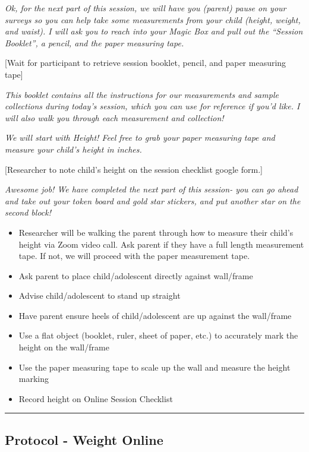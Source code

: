 \documentclass[]{book}
\providecommand{\tightlist}{%
  \setlength{\itemsep}{0pt}\setlength{\parskip}{0pt}}
\begin{document}
\emph{Ok, for the next part of this session, we will have you (parent) pause on your surveys so you can help take some measurements from your child (height, weight, and waist). I will ask you to reach into your Magic Box and pull out the ``Session Booklet'', a pencil, and the paper measuring tape.}

{[}Wait for participant to retrieve session booklet, pencil, and paper measuring tape{]}

\emph{This booklet contains all the instructions for our measurements and sample collections during today's session, which you can use for reference if you'd like. I will also walk you through each measurement and collection!}

\emph{We will start with Height! Feel free to grab your paper measuring tape and measure your child's height in inches.}

{[}Researcher to note child's height on the session checklist google form.{]}

\emph{Awesome job! We have completed the next part of this session- you can go ahead and take out your token board and gold star stickers, and put another star on the second block!}

\begin{itemize}
\tightlist
\item
  Researcher will be walking the parent through how to measure their child's height via Zoom video call. Ask parent if they have a full length measurement tape. If not, we will proceed with the paper measurement tape.
\item
  Ask parent to place child/adolescent directly against wall/frame
\item
  Advise child/adolescent to stand up straight
\item
  Have parent ensure heels of child/adolescent are up against the wall/frame
\item
  Use a flat object (booklet, ruler, sheet of paper, etc.) to accurately mark the height on the wall/frame
\item
  Use the paper measuring tape to scale up the wall and measure the height marking
\item
  Record height on Online Session Checklist
\end{itemize}

\begin{center}\rule{0.5\linewidth}{0.5pt}\end{center}

\hypertarget{protocol---weight-online}{%
\subsection{Protocol - Weight Online}\label{protocol---weight-online}}
\end{document}
